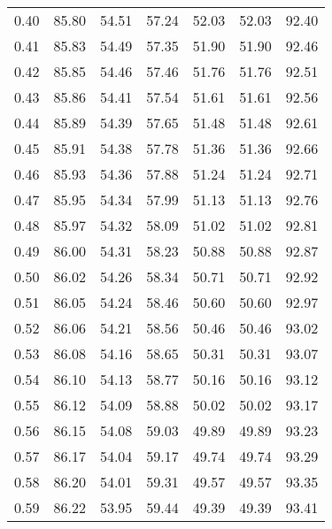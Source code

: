 \begin{tabular}{|c|c|c|c|c|c|c|}
      0.40 &     85.80 &     54.51 &      57.24 &   52.03 &      52.03 &         92.40 \\
      0.41 &     85.83 &     54.49 &      57.35 &   51.90 &      51.90 &         92.46 \\
      0.42 &     85.85 &     54.46 &      57.46 &   51.76 &      51.76 &         92.51 \\
      0.43 &     85.86 &     54.41 &      57.54 &   51.61 &      51.61 &         92.56 \\
      0.44 &     85.89 &     54.39 &      57.65 &   51.48 &      51.48 &         92.61 \\
      0.45 &     85.91 &     54.38 &      57.78 &   51.36 &      51.36 &         92.66 \\
      0.46 &     85.93 &     54.36 &      57.88 &   51.24 &      51.24 &         92.71 \\
      0.47 &     85.95 &     54.34 &      57.99 &   51.13 &      51.13 &         92.76 \\
      0.48 &     85.97 &     54.32 &      58.09 &   51.02 &      51.02 &         92.81 \\
      0.49 &     86.00 &     54.31 &      58.23 &   50.88 &      50.88 &         92.87 \\
      0.50 &     86.02 &     54.26 &      58.34 &   50.71 &      50.71 &         92.92 \\
      0.51 &     86.05 &     54.24 &      58.46 &   50.60 &      50.60 &         92.97 \\
      0.52 &     86.06 &     54.21 &      58.56 &   50.46 &      50.46 &         93.02 \\
      0.53 &     86.08 &     54.16 &      58.65 &   50.31 &      50.31 &         93.07 \\
      0.54 &     86.10 &     54.13 &      58.77 &   50.16 &      50.16 &         93.12 \\
      0.55 &     86.12 &     54.09 &      58.88 &   50.02 &      50.02 &         93.17 \\
      0.56 &     86.15 &     54.08 &      59.03 &   49.89 &      49.89 &         93.23 \\
      0.57 &     86.17 &     54.04 &      59.17 &   49.74 &      49.74 &         93.29 \\
      0.58 &     86.20 &     54.01 &      59.31 &   49.57 &      49.57 &         93.35 \\
      0.59 &     86.22 &     53.95 &      59.44 &   49.39 &      49.39 &         93.41 \\

\end{tabular}
